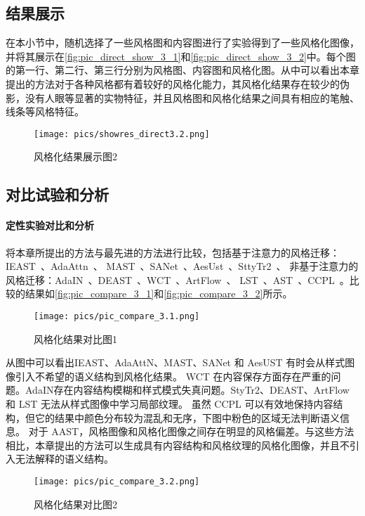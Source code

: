 \subsection{结果展示}
在本小节中，随机选择了一些风格图和内容图进行了实验得到了一些风格化图像，并将其展示在\autoref{fig:pic_direct_show_3_1}和\autoref{fig:pic_direct_show_3_2}中。每个图的第一行、第二行、第三行分别为风格图、内容图和风格化图。从中可以看出本章提出的方法对于各种风格都有着较好的风格化能力，其风格化结果存在较少的伪影，没有人眼等显著的实物特征，并且风格图和风格化结果之间具有相应的笔触、线条等风格特征。
\begin{figure}[htbp]
    \centering
    \texttt{[image: pics/showres\_direct3.2.png]}
    \caption{\label{fig:pic_direct_show_3_2}风格化结果展示图2}
\end{figure}
\subsection{对比试验和分析}
\paragraph{定性实验对比和分析}
将本章所提出的方法与最先进的方法进行比较，包括基于注意力的风格迁移：IEAST~\cite{chen2021artistic}、AdaAttn~\cite{liu2021adaattn}、
MAST~\cite{deng2020arbitrary}、SANet~\cite{park2019arbitrary}、AesUst~\cite{wang2022aesust}、SttyTr2~\cite{deng2022stytr2}、
非基于注意力的风格迁移：AdaIN~\cite{huang2017arbitrary}、DEAST~\cite{zhang2022domain}、WCT~\cite{li2017universal}、ArtFlow~\cite{an2021artflow}、
LST~\cite{li2019learning}、AST~\cite{hu2020aesthetic}、CCPL~\cite{wu2022ccpl}。比较的结果如\autoref{fig:pic_compare_3_1}和\autoref{fig:pic_compare_3_2}所示。
\begin{figure}[htb]
    \centering
    \texttt{[image: pics/pic\_compare\_3.1.png]}
    \caption{\label{fig:pic_compare_3_1}风格化结果对比图1}
\end{figure}
从图中可以看出IEAST、AdaAttN、MAST、SANet 和 AesUST 有时会从样式图像引入不希望的语义结构到风格化结果。
WCT 在内容保存方面存在严重的问题。AdaIN存在内容结构模糊和样式模式失真问题。StyTr2、DEAST、ArtFlow 和 LST 无法从样式图像中学习局部纹理。
虽然 CCPL 可以有效地保持内容结构，但它的结果中颜色分布较为混乱和无序，下图中粉色的区域无法判断语义信息。
对于 AAST，风格图像和风格化图像之间存在明显的风格偏差。与这些方法相比，本章提出的方法可以生成具有内容结构和风格纹理的风格化图像，并且不引入无法解释的语义结构。
\begin{figure}[htb]
    \centering
    \texttt{[image: pics/pic\_compare\_3.2.png]}
    \caption{\label{fig:pic_compare_3_2}风格化结果对比图2}
\end{figure}

